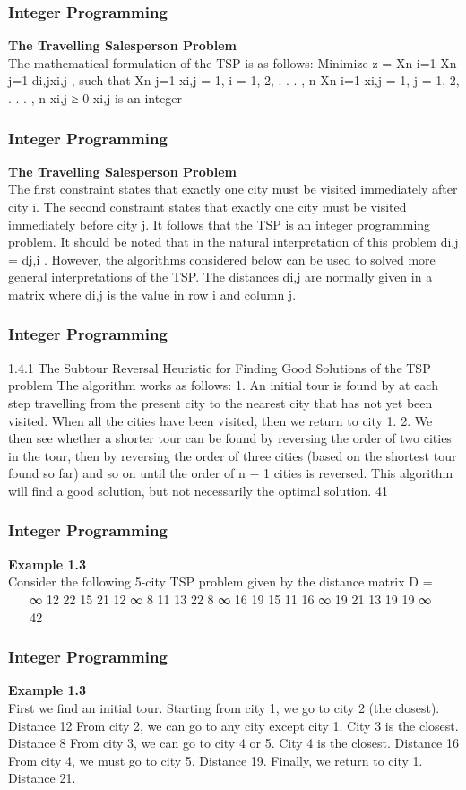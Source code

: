 \begin{frame} 
\frametitle{Integer Programming}     
\noindent \textbf{The Travelling Salesperson Problem}\\
The mathematical formulation of the TSP is as follows: Minimize
z =
Xn
i=1
Xn
j=1
di,jxi,j
,
such that
Xn
j=1
xi,j = 1, i = 1, 2, . . . , n
Xn
i=1
xi,j = 1, j = 1, 2, . . . , n
xi,j ≥ 0 xi,j
is an integer
\end{frame}  
\begin{frame} 
\frametitle{Integer Programming}     
\noindent \textbf{The Travelling Salesperson Problem}\\

The first constraint states that exactly one city must be visited
immediately after city i.
The second constraint states that exactly one city must be visited
immediately before city j.
It follows that the TSP is an integer programming problem.
It should be noted that in the natural interpretation of this
problem di,j = dj,i
. However, the algorithms considered below can
be used to solved more general interpretations of the TSP.
The distances di,j are normally given in a matrix where di,j
is the
value in row i and column j.
\end{frame}  
\begin{frame}
 \frametitle{Integer Programming}     

1.4.1 The Subtour Reversal Heuristic for Finding Good
Solutions of the TSP problem
The algorithm works as follows:
1. An initial tour is found by at each step travelling
from the present city to the nearest city that has not
yet been visited. When all the cities have been
visited, then we return to city 1.
2. We then see whether a shorter tour can be found by
reversing the order of two cities in the tour, then by
reversing the order of three cities (based on the
shortest tour found so far) and so on until the order
of n − 1 cities is reversed.
This algorithm will find a good solution, but not necessarily the
optimal solution.
41 
\end{frame}  
\begin{frame} 
\frametitle{Integer Programming}     
\noindent \textbf{Example 1.3}\\
Consider the following 5-city TSP problem given by the distance
matrix
D =


∞ 12 22 15 21
12 ∞ 8 11 13
22 8 ∞ 16 19
15 11 16 ∞ 19
21 13 19 19 ∞


42 \end{frame}  \begin{frame} \frametitle{Integer Programming}     
\noindent \textbf{Example 1.3}\\
First we find an initial tour. Starting from city 1, we go to city 2
(the closest). Distance 12
From city 2, we can go to any city except city 1. City 3 is the
closest. Distance 8
From city 3, we can go to city 4 or 5. City 4 is the closest.
Distance 16
From city 4, we must go to city 5. Distance 19.
Finally, we return to city 1. Distance 21.
\end{frame}  
